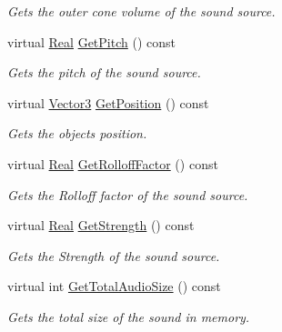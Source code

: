 \begin{DoxyCompactItemize}
\begin{DoxyCompactList}\small\item\em Gets the outer cone volume of the sound source. \item\end{DoxyCompactList}\item 
virtual \hyperlink{namespaceMezzanine_a726731b1a7df72bf3583e4a97282c6f6}{Real} \hyperlink{classMezzanine_1_1Audio_1_1Sound_a95876ef2df75b0f780c06b6abd0e134f}{GetPitch} () const 
\begin{DoxyCompactList}\small\item\em Gets the pitch of the sound source. \item\end{DoxyCompactList}\item 
virtual \hyperlink{classMezzanine_1_1Vector3}{Vector3} \hyperlink{classMezzanine_1_1Audio_1_1Sound_a9d4712b50c270c34446d238855b4a73f}{GetPosition} () const 
\begin{DoxyCompactList}\small\item\em Gets the objects position. \item\end{DoxyCompactList}\item 
virtual \hyperlink{namespaceMezzanine_a726731b1a7df72bf3583e4a97282c6f6}{Real} \hyperlink{classMezzanine_1_1Audio_1_1Sound_a89751ce8cd36d57b6214c89b7d6a878c}{GetRolloffFactor} () const 
\begin{DoxyCompactList}\small\item\em Gets the Rolloff factor of the sound source. \item\end{DoxyCompactList}\item 
virtual \hyperlink{namespaceMezzanine_a726731b1a7df72bf3583e4a97282c6f6}{Real} \hyperlink{classMezzanine_1_1Audio_1_1Sound_afd8808de9c5b5e6b6f150d0d40455dc0}{GetStrength} () const 
\begin{DoxyCompactList}\small\item\em Gets the Strength of the sound source. \item\end{DoxyCompactList}\item 
virtual int \hyperlink{classMezzanine_1_1Audio_1_1Sound_a25ea84a94dc52a85adee4a407fb5147a}{GetTotalAudioSize} () const 
\begin{DoxyCompactList}\small\item\em Gets the total size of the sound in memory. \item\end{DoxyCompactList}\item 

\end{DoxyCompactItemize}
